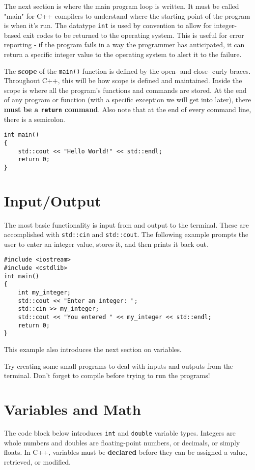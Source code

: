The next section is where the main program loop is written.  It must be called "main" for C++ compilers to understand where the starting point of the program is when it's run.  The datatype \texttt{int} is used by convention to allow for integer-based exit codes to be returned to the operating system.  This is useful for error reporting - if the program fails in a way the programmer has anticipated, it can return a specific integer value to the operating system to alert it to the failure.

The \textbf{scope} of the \texttt{main()} function is defined by the open- and close- curly braces.  Throughout C++, this will be how scope is defined and maintained.  Inside the scope is where all the program's functions and commands are stored.  At the end of any program or function (with a specific exception we will get into later), there \textbf{must be a \texttt{return} command}.  Also note that at the end of every command line, there is a semicolon.
\begin{verbatim}
int main()
{
    std::cout << "Hello World!" << std::endl;
    return 0;
}
\end{verbatim}
\section{Input/Output}
\paragraph{} The most basic functionality is input from and output to the terminal.  These are accomplished with \texttt{std::cin} and \texttt{std::cout}.  The following example prompts the user to enter an integer value, stores it, and then prints it back out.

\begin{verbatim}
#include <iostream>
#include <cstdlib>
int main()
{
    int my_integer;
    std::cout << "Enter an integer: ";
    std::cin >> my_integer;
    std::cout << "You entered " << my_integer << std::endl;
    return 0;
}
\end{verbatim}
This example also introduces the next section on variables.

\begin{homework}
Try creating some small programs to deal with inputs and outputs from the terminal.  Don't forget to compile before trying to run the programs!
\end{homework}
\section{Variables and Math}
The code block below introduces \texttt{int} and \texttt{double} variable types.  Integers are whole numbers and doubles are floating-point numbers, or decimals, or simply floats.
In C++, variables must be \textbf{declared} before they can be assigned a value, retrieved, or modified.

